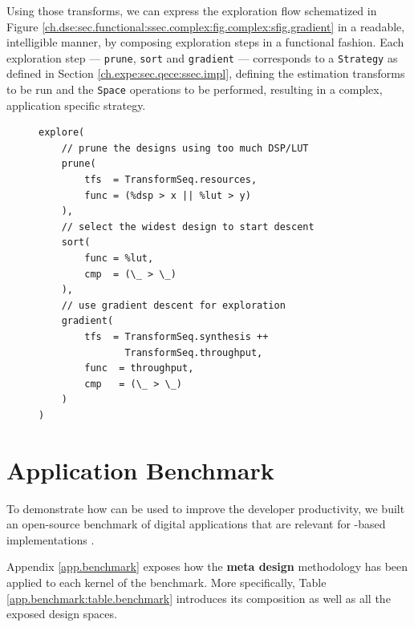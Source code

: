 \clearpage
            Using those transforms, we can express the exploration flow schematized in Figure \ref{ch.dse:sec.functional:ssec.complex:fig.complex:sfig.gradient} in a readable, intelligible manner, by composing exploration steps in a functional fashion.
            Each exploration step --- \ie \lstinline{prune}, \lstinline{sort} and \lstinline{gradient} --- corresponds to a \lstinline{Strategy} as defined in Section \ref{ch.expe:sec.qece:ssec.impl}, defining the estimation transforms to be run and the \lstinline{Space} operations to be performed, resulting in a complex, application specific strategy.


        \begin{figure}[h!]
            \begin{lstlisting}[caption={[Gradient based strategy definition]Defining a gradient descent based strategy (Fig. \ref{ch.dse:sec.functional:ssec.complex:fig.complex:sfig.gradient}) in QECE},
                               label={ch.expe:sec.qece:list.gradient}]
explore(
    // prune the designs using too much DSP/LUT
    prune(
        tfs  = TransformSeq.resources,
        func = (%dsp > x || %lut > y)
    ),
    // select the widest design to start descent
    sort(
        func = %lut,
        cmp  = (\_ > \_)
    ),
    // use gradient descent for exploration
    gradient(
        tfs  = TransformSeq.synthesis ++ 
               TransformSeq.throughput,
        func  = throughput,
        cmp   = (\_ > \_)
    )
)\end{lstlisting}
        \end{figure}


\section{Application Benchmark}
\label{ch.expe:sec.benchmark}

    To demonstrate how  can be used to improve the developer productivity, we built an open-source benchmark of digital applications that are relevant for -based implementations \cite{ferres_benchmark_2021}.

    Appendix \ref{app.benchmark} exposes how the {\bf meta design} methodology has been applied to each kernel of the benchmark.
    More specifically, Table \ref{app.benchmark:table.benchmark} introduces its composition as well as all the exposed design spaces.
    
